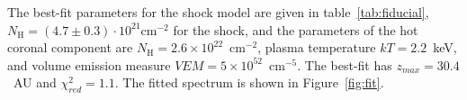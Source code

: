 The best-fit parameters for the shock model are given in table~\ref{tab:fiducial}, $N_\textrm{H}=(4.7\pm0.3)\cdot10^{21}\mathrm{ cm}^{-2}$ for the shock, and the parameters of the hot coronal component are $N_\textrm{H}=2.6\times10^{22}$~cm$^{-2}$, plasma temperature $kT = 2.2$~keV, and volume emission measure $VEM=5\times10^{52}$~cm$^{-5}$. The best-fit has $z_{max} = 30.4$~AU and $\chi^2_{red}= 1.1$. The fitted spectrum is shown in Figure~\ref{fig:fit}.